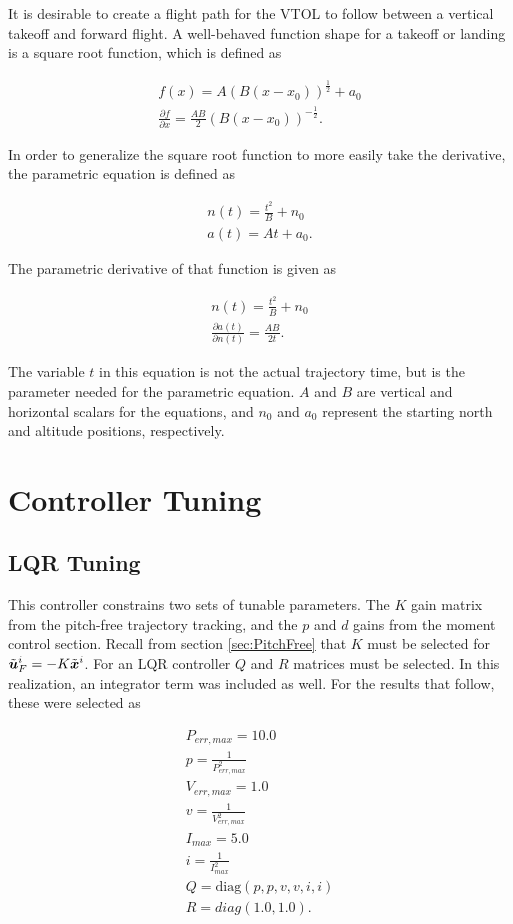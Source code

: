 It is desirable to create a flight path for the VTOL to follow between a vertical takeoff and forward flight. 
A well-behaved function shape for a takeoff or landing is a square root function, which is defined as

\begin{align}
    f(x) = A(B(x-x_0))^\frac{1}{2} + a_0\\
    \frac{\partial f}{\partial x} = \frac{AB}{2}(B(x-x_0))^{-\frac{1}{2}}.
\end{align}

In order to generalize the square root function to more easily take the derivative, the parametric equation is defined as

\begin{align}
    n(t) = \frac{t^2}{B} + n_0\\
    a(t) = At + a_0.
\end{align}

The parametric derivative of that function is given as

\begin{align}
    n(t) = \frac{t^2}{B} + n_0\\
    \frac{\partial a(t)}{\partial n(t)} = \frac{AB}{2t}.
\end{align}

The variable $t$ in this equation is not the actual trajectory time, but is the parameter needed for the parametric equation. 
$A$ and $B$ are vertical and horizontal scalars for the equations, and $n_0$ and $a_0$ represent the starting north and altitude positions, respectively.

\section{Controller Tuning}

\subsection{LQR Tuning}
This controller constrains two sets of tunable parameters. 
The $K$ gain matrix from the pitch-free trajectory tracking, and the $p$ and $d$ gains from the moment control section.
Recall from section \ref{sec:PitchFree} that $K$ must be selected for $\tilde{\boldsymbol{u}}_F^i = -K \tilde{\boldsymbol{x}}^i$.
For an LQR controller $Q$ and $R$ matrices must be selected. 
In this realization, an integrator term was included as well. 
For the results that follow, these were selected as

\begin{align}
    P_{err,max} = 10.0\\
    p = \frac{1}{P_{err,max}^2}\\
    V_{err,max} = 1.0\\
    v = \frac{1}{V_{err,max}^2}\\
    I_{max} = 5.0\\
    i = \frac{1}{I_{max}^2}\\
    Q = \mathrm{diag}(p,p,v,v,i,i)\\
    R = diag(1.0, 1.0).
\end{align}

